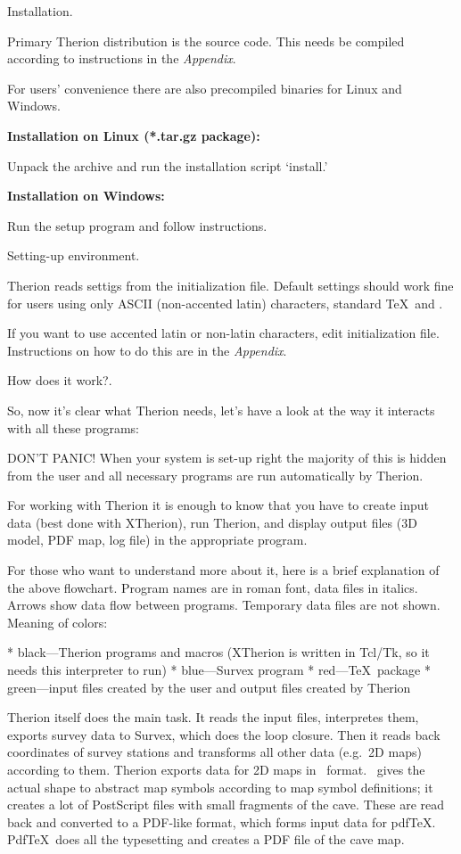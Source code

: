 \subchapter Installation.

Primary Therion distribution is the source code. This needs be compiled 
according to instructions in the {\it Appendix}.

For users' convenience there are also precompiled binaries for Linux and 
Windows. 

{\bf Installation on Linux (*.tar.gz package):}

Unpack the archive and run the installation script `install.'

{\bf Installation on Windows:}

Run the setup program and follow instructions.


\subsubchapter Setting-up environment.

Therion reads settigs from the initialization file. Default settings should 
work fine for users using only ASCII (non-accented latin) characters, 
standard \TeX\ and \MP. 

If you want to use accented latin or non-latin characters, edit initialization 
file. Instructions on how to do this are in the {\it Appendix}.


\subchapter How does it work?.

So, now it's clear what Therion needs, let's have a look at the way 
it interacts with all these programs:


DON'T PANIC! When your system is set-up right the majority of this is hidden from 
the user and all necessary programs are run automatically by Therion. 

For working with Therion it is enough to know that you have to create input data 
(best done with XTherion), run Therion, and display output files 
(3D model, PDF map, log file) in the appropriate program. 

For those who want to understand more about it, here is a brief explanation of 
the above flowchart. Program names are in roman font, data files in italics. 
Arrows show data flow between programs. Temporary data files are not shown. 
Meaning of colors:

\list
* black---Therion programs and macros (XTherion is written in Tcl/Tk,
  so it needs this interpreter to run)
* blue---Survex program
* red---\TeX\ package
* green---input files created by the user and output files created by Therion
\endlist

Therion itself does the main task. It reads the input files, interpretes them, 
exports survey data to Survex, which does the loop closure. Then it reads back 
coordinates of survey stations and transforms all other data (e.g.~2D maps) 
according to them. Therion exports data for 2D maps in \MP\ format. \MP\ gives 
the actual shape to abstract map symbols according to map symbol definitions; it
creates a lot of PostScript files with small fragments of the cave. These are 
read back and converted to a PDF-like format, which forms input data 
for pdf\TeX. Pdf\TeX\ does all the typesetting and creates a PDF file of the cave 
map. 

